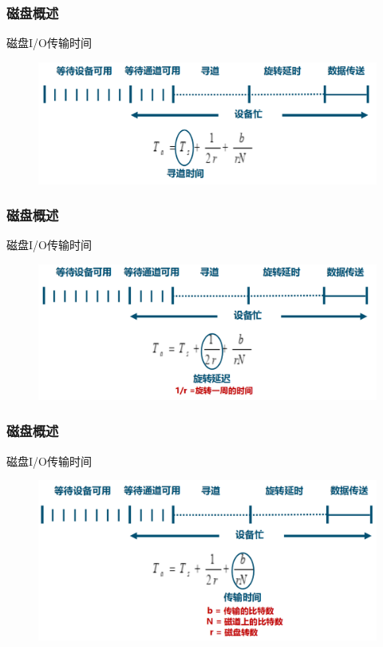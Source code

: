 \begin{frame}[fragile]
    \frametitle{磁盘概述}
    磁盘I/O传输时间
    \begin{figure}
        \includegraphics[width=0.8\linewidth]{figs/disk-time2.png}
    \end{figure}
\end{frame}

\begin{frame}[fragile]
    \frametitle{磁盘概述}
    磁盘I/O传输时间
    \begin{figure}
        \includegraphics[width=0.8\linewidth]{figs/disk-time3.png}
    \end{figure}
\end{frame}

\begin{frame}[fragile]
    \frametitle{磁盘概述}
    磁盘I/O传输时间
    \begin{figure}
        \includegraphics[width=0.8\linewidth]{figs/disk-time4.png}
    \end{figure}
\end{frame}

